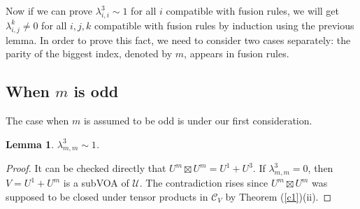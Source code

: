 \documentclass{article}
\newtheorem{lemma}{Lemma}[section]
\begin{document}
Now if we can prove $\lambda_{i,i}^3\sim 1$ for all $i$ compatible with fusion rules, 
we will get $\lambda_{i,j}^k\neq 0$ for all $i,j,k$ compatible with fusion rules by induction using the previous lemma.
In order to prove this fact, 
we need to consider two cases separately:
the parity of the biggest index, 
denoted by $m$, 
appears in fusion rules.

\subsection{When $m$ is odd}
The case when $m$ is assumed to be odd is under our first consideration.


\begin{lemma}
$\lambda_{m,m}^3\sim 1$.
\end{lemma}
\begin{proof}
It can be checked directly that $U^m\boxtimes U^m=U^1+U^3$.
If $\lambda_{m,m}^3=0$, then $V=U^1+U^m$ is a subVOA of $\mathcal{U}$.
The contradiction rises since $U^m\boxtimes U^m$ was supposed to be closed under tensor products in $\mathcal{C}_V$ by Theorem (\ref{c1})(ii). 
\end{proof}







\end{document}
